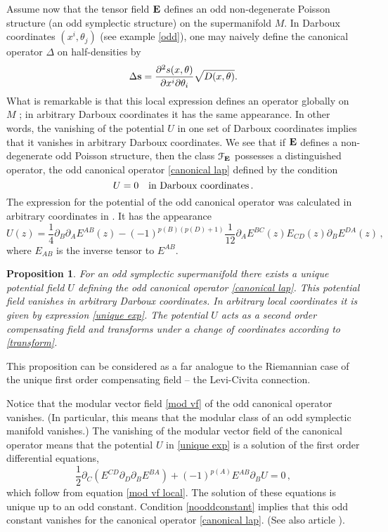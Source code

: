 \documentclass[12pt,reqno,a4paper]{amsart}
\newtheorem{proposition}{Proposition}
\theoremstyle{definition}
\begin{document}
  Assume now that the tensor field
${{\bf E}}$ defines an odd non-degenerate Poisson structure
(an odd symplectic structure) on the supermanifold $M$.
 In Darboux coordinates $(x^i,\theta_j)$ (see example \ref{odd}),
one may naively define the canonical operator $\Delta$
on half-densities by
    \begin{equation}\label{canonical lap}
    \Delta{{\bf s}} = \frac{{\partial}^2s(x,\theta)}{{\partial} x^i{\partial} \theta_i}\sqrt{D(x,\theta)}.
    \end{equation}
What is remarkable is that this local expression defines
  an operator globally on $M$ \cite{Khcmp2};
in arbitrary Darboux coordinates it has the same appearance.
   In other words, the vanishing of the potential $U$
in one set of Darboux coordinates implies that it vanishes in arbitrary Darboux
coordinates. We see that
 if ${{\bf E}}$ defines a non-degenerate odd Poisson structure, then
the class ${{\mathcal{F}}}_{{\bf E}}$ possesses a distinguished operator, the
  odd canonical operator \eqref{canonical lap} defined by the condition
            \begin{equation}\label{nooddconstant}
             U=0\quad\hbox{in Darboux coordinates}\,.
          \end{equation}
The expression for the potential of the odd canonical operator
  was calculated in arbitrary coordinates in \cite{Bering1}.
 It has the appearance
    \begin{equation}\label{unique exp}
    U(z) = \frac{1}{4}{\partial}_B{\partial}_A E^{AB}(z) -
    (-1)^{p(B)(p(D)+1)}\frac{1}{12}{\partial}_AE^{BC}(z)E_{CD}(z){\partial}_BE^{DA}(z)\,,
    \end{equation}
where $E_{AB}$ is the inverse tensor to $E^{AB}$.

\begin{proposition}
{\it For an odd symplectic supermanifold there exists a unique
potential field $U$ defining the odd canonical operator \eqref{canonical lap}.
This potential field vanishes in arbitrary Darboux coordinates.
In arbitrary local coordinates it is given by expression \eqref{unique exp}.
The potential $U$
acts as a second order compensating field and transforms under a
change of coordinates according to \eqref{transform}.}
\end{proposition}

This proposition can be considered as a far analogue to the Riemannian case
of the unique first order
   compensating field -- the Levi-Civita connection.

Notice that the modular vector field \eqref{mod vf}
of the odd canonical operator vanishes.
(In particular, this means that the modular class of an odd symplectic manifold
vanishes.)
The vanishing of the modular vector field of the canonical operator
means that the potential $U$ in \eqref{unique exp} is a solution of the
 first order differential equations,
     $$
  \frac{1}{2}{\partial}_C\left(E^{CD}{\partial}_D{\partial}_BE^{BA}\right)
     + (-1)^{p(A)}E^{AB}{\partial}_BU = 0\,,
   $$
which follow from equation \eqref{mod vf local}.
The solution of these equations is unique up to an odd constant.
Condition \eqref{nooddconstant} implies that this odd constant
vanishes for the canonical operator \eqref{canonical lap}. (See also article \cite{BatBer1}).
\end{document}
